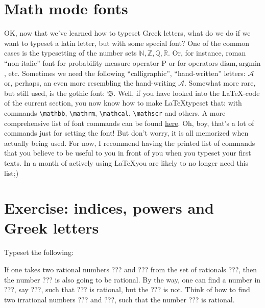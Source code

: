 \section{Math mode fonts}
\par OK, now that we’ve learned how to typeset Greek letters, what do we do if we want to typeset a latin letter, but with some special font? One of the common cases is the typesetting of the number sets \(\mathbb{N}, \mathbb{Z}, \mathbb{Q}, \mathbb{R}\). Or, for instance, roman “non-italic” font for probability measure operator \(\mathrm{P}\) or for operators \(\mathrm{diam}, \mathrm{argmin}\), etc. Sometimes we need the following “calligraphic”, “hand-written” letters: \(\mathcal{A}\) or, perhaps, an even more resembling the hand-writing \(\mathscr{A}\). Somewhat more rare, but still used, is the gothic font: \( \mathfrak{B} \). Well, if you have looked into the \LaTeX-code of the current section, you now know how to make \LaTeX typeset that: with commands \verb"\mathbb", \verb"\mathrm", \verb"\mathcal", \verb"\mathscr" and others. A more comprehensive list of font commands can be found \href{https://tex.stackexchange.com/a/58124}{here}. Oh, boy, that’s a lot of commands just for setting the font! But don’t worry, it is all memorized when actually being used. For now, I recommend having the printed list of commands that you believe to be useful to you in front of you when you typeset your first texts. In a month of actively using \LaTeX you are likely to no longer need this list;)

\section{Exercise: indices, powers and Greek letters}
\begin{staticpart}
Typeset the following:
\end{staticpart}
\par If one takes two rational numbers ??? and ??? from the set of rationals ???, then the number ??? is also going to be rational. By the way, one can find a number in ???, say ???, such that ??? is rational, but the ??? is not. Think of how to find two irrational numbers ??? and ???, such that the number ??? is rational.

